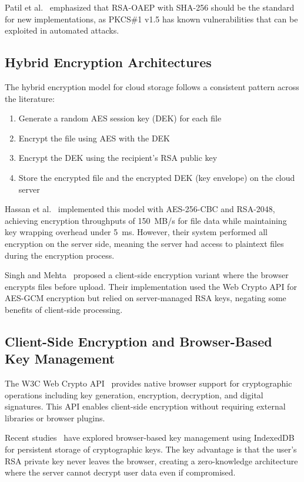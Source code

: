 \documentclass[conference]{IEEEtran}
\begin{document}
Patil et al.~\cite{patil2024client} emphasized that RSA-OAEP with SHA-256 should be the standard for new implementations, as PKCS\#1 v1.5 has known vulnerabilities that can be exploited in automated attacks.

\subsection{Hybrid Encryption Architectures}

The hybrid encryption model for cloud storage follows a consistent pattern across the literature:

\begin{enumerate}
    \item Generate a random AES session key (DEK) for each file
    \item Encrypt the file using AES with the DEK
    \item Encrypt the DEK using the recipient's RSA public key
    \item Store the encrypted file and the encrypted DEK (key envelope) on the cloud server
\end{enumerate}

Hassan et al.~\cite{hassan2023enhanced} implemented this model with AES-256-CBC and RSA-2048, achieving encryption throughputs of 150~MB/s for file data while maintaining key wrapping overhead under 5~ms. However, their system performed all encryption on the server side, meaning the server had access to plaintext files during the encryption process.

Singh and Mehta~\cite{singh2023hybrid} proposed a client-side encryption variant where the browser encrypts files before upload. Their implementation used the Web Crypto API for AES-GCM encryption but relied on server-managed RSA keys, negating some benefits of client-side processing.

\subsection{Client-Side Encryption and Browser-Based Key Management}

The W3C Web Crypto API~\cite{w3cwebcrypto} provides native browser support for cryptographic operations including key generation, encryption, decryption, and digital signatures. This API enables client-side encryption without requiring external libraries or browser plugins.

Recent studies~\cite{nimbus2024, patil2024client} have explored browser-based key management using IndexedDB for persistent storage of cryptographic keys. The key advantage is that the user's RSA private key never leaves the browser, creating a zero-knowledge architecture where the server cannot decrypt user data even if compromised.
\end{document}

